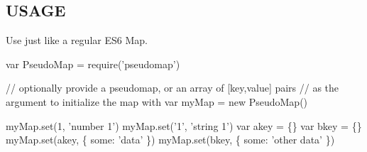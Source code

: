 \subsection*{U\+S\+A\+GE}

Use just like a regular E\+S6 Map.


\begin{DoxyCode}
var PseudoMap = require('pseudomap')

// optionally provide a pseudomap, or an array of [key,value] pairs
// as the argument to initialize the map with
var myMap = new PseudoMap()

myMap.set(1, 'number 1')
myMap.set('1', 'string 1')
var akey = \{\}
var bkey = \{\}
myMap.set(akey, \{ some: 'data' \})
myMap.set(bkey, \{ some: 'other data' \})
\end{DoxyCode}
 